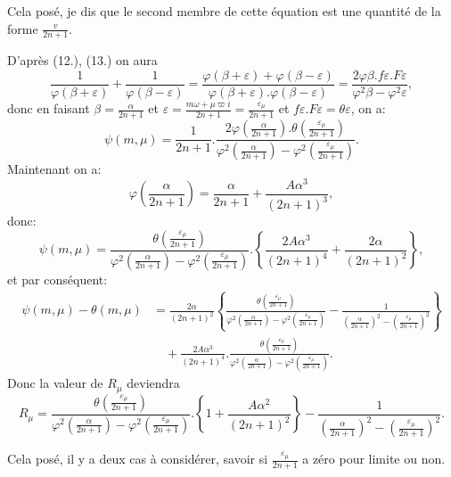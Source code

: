 \documentclass{article}
\begin{document}
Cela posé, je dis que le second membre de cette équation est une quantité de la forme $\frac{v}{2n+1}$.


D'après (12.), (13.) on aura
\[ \frac{1}{\varphi(\beta+\varepsilon)}+\frac{1}{\varphi(\beta-\varepsilon)}=\frac{\varphi(\beta+\varepsilon)+\varphi(\beta-\varepsilon)}{\varphi(\beta+\varepsilon).\varphi(\beta-\varepsilon)}=\frac{2\varphi\beta.f\varepsilon.F\varepsilon}{\varphi^{2}\beta-\varphi^{2}\varepsilon}, \]
donc en faisant $\beta=\frac{\alpha}{2n+1}$ et $\varepsilon=\frac{m\omega+\mu\varpi i}{2n+1}=\frac{\varepsilon_{\mu}}{2n+1}$ et $f\varepsilon.F\varepsilon=\theta\varepsilon$, on a:
\[ \psi(m,\mu)=\frac{1}{2n+1}.\frac{2\varphi\left(\frac{\alpha}{2n+1}\right).\theta\left(\frac{\varepsilon_{\mu}}{2n+1}\right)}{\varphi^{2}\left(\frac{\alpha}{2n+1}\right)-\varphi^{2}\left(\frac{\varepsilon_{\mu}}{2n+1}\right)}. \]
Maintenant on a:
\[ \varphi\left(\frac{\alpha}{2n+1}\right)=\frac{\alpha}{2n+1}+\frac{A\alpha^{3}}{(2n+1)^{3}}, \]
donc:
\[ \psi(m,\mu)=\frac{\theta\left(\frac{\varepsilon_{\mu}}{2n+1}\right)}{\varphi^{2}\left(\frac{\alpha}{2n+1}\right)-\varphi^{2}\left(\frac{\varepsilon_{\mu}}{2n+1}\right)}.\left\{\frac{2A\alpha^{3}}{(2n+1)^{4}}+\frac{2\alpha}{(2n+1)^{2}}\right\}, \]
et par conséquent:
\[ \begin{aligned}
\psi(m,\mu)-\theta(m,\mu)&=\frac{2\alpha}{(2n+1)^{2}}\left\{\frac{\theta\left(\frac{\varepsilon_{\mu}}{2n+1}\right)}{\varphi^{2}\left(\frac{\alpha}{2n+1}\right)-\varphi^{2}\left(\frac{\varepsilon_{\mu}}{2n+1}\right)}-\frac{1}{\left(\frac{\alpha}{2n+1}\right)^{2}-\left(\frac{\varepsilon_{\mu}}{2n+1}\right)^{2}}\right\}\\
&\quad+\frac{2A\alpha^{3}}{(2n+1)^{4}}.\frac{\theta\left(\frac{\varepsilon_{\mu}}{2n+1}\right)}{\varphi^{2}\left(\frac{\alpha}{2n+1}\right)-\varphi^{2}\left(\frac{\varepsilon_{\mu}}{2n+1}\right)}.
\end{aligned} \]
Donc la valeur de $R_{\mu}$ deviendra
\[ R_{\mu}=\frac{\theta\left(\frac{\varepsilon_{\mu}}{2n+1}\right)}{\varphi^{2}\left(\frac{\alpha}{2n+1}\right)-\varphi^{2}\left(\frac{\varepsilon_{\mu}}{2n+1}\right)}.\left\{1+\frac{A\alpha^{2}}{(2n+1)^{2}}\right\}-\frac{1}{\left(\frac{\alpha}{2n+1}\right)^{2}-\left(\frac{\varepsilon_{\mu}}{2n+1}\right)^{2}}. \tag{138.} \]

Cela posé, il y a deux cas à considérer, savoir si $\frac{\varepsilon_{\mu}}{2n+1}$ a zéro pour limite ou non.
\end{document}
